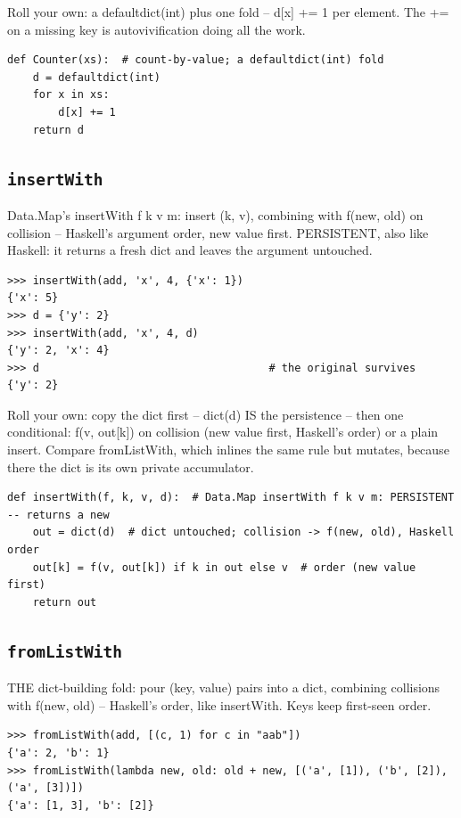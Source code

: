 \documentclass[10pt,letterpaper]{book}
\begin{document}
Roll your own: a defaultdict(int) plus one fold -- d[x] += 1 per element. The += on a missing key is autovivification doing all the work.

\begin{lstlisting}[style=ex]
def Counter(xs):  # count-by-value; a defaultdict(int) fold
    d = defaultdict(int)
    for x in xs:
        d[x] += 1
    return d
\end{lstlisting}
\subsection{\texttt{insertWith}}\label{def:insertWith}
Data.Map's insertWith f k v m: insert (k, v), combining with f(new, old) on collision -- Haskell's argument order, new value first. PERSISTENT, also like Haskell: it returns a fresh dict and leaves the argument untouched.
\begin{lstlisting}[style=ex]
>>> insertWith(add, 'x', 4, {'x': 1})
{'x': 5}
>>> d = {'y': 2}
>>> insertWith(add, 'x', 4, d)
{'y': 2, 'x': 4}
>>> d                                    # the original survives
{'y': 2}
\end{lstlisting}

Roll your own: copy the dict first -- dict(d) IS the persistence -- then one conditional: f(v, out[k]) on collision (new value first, Haskell's order) or a plain insert. Compare fromListWith, which inlines the same rule but mutates, because there the dict is its own private accumulator.

\begin{lstlisting}[style=ex]
def insertWith(f, k, v, d):  # Data.Map insertWith f k v m: PERSISTENT -- returns a new
    out = dict(d)  # dict untouched; collision -> f(new, old), Haskell order
    out[k] = f(v, out[k]) if k in out else v  # order (new value first)
    return out
\end{lstlisting}
\subsection{\texttt{fromListWith}}\label{def:fromListWith}
THE dict-building fold: pour (key, value) pairs into a dict, combining collisions with f(new, old) -- Haskell's order, like insertWith. Keys keep first-seen order.
\begin{lstlisting}[style=ex]
>>> fromListWith(add, [(c, 1) for c in "aab"])
{'a': 2, 'b': 1}
>>> fromListWith(lambda new, old: old + new, [('a', [1]), ('b', [2]), ('a', [3])])
{'a': [1, 3], 'b': [2]}
\end{lstlisting}
\end{document}
